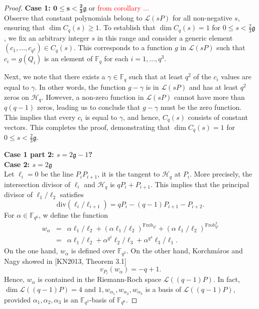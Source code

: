 \documentclass[11pt]{amsart}
\theoremstyle{plain}
\theoremstyle{definition}
\theoremstyle{remark}
\newcommand{\g}{\mathfrak{g}}
\begin{document}
\begin{proof}
	\textbf{Case 1: $\mathbf{0 \leq s <\frac{2}{3}\g}$} or \textcolor{red}{from corollary ...}\\
	Observe that constant polynomials belong to $\mathscr{L}(sP)$ for all non-negative $s$, ensuring that $\dim C_{q}(s)\geq 1$. To establish that $\dim C_{q}(s) = 1$ for $0 \leq s <\frac{2}{3}\g$, we fix an arbitrary integer $s$ in this range and consider a generic element $(c_1,\ldots,c_{q^3}) \in C_{q}(s)$. This corresponds to a function $g$ in $\mathscr{L}(sP)$ such that $c_i=g(Q_i)$ is an element of $\mathbb{F}_q$ for each $i=1,\ldots,q^3$. 
	
	Next, we note that there exists a $\gamma \in \mathbb{F}_q$ such that at least $q^2$ of the $c_i$ values are equal to $\gamma$. In other words, the function $g-\gamma$ is in $\mathscr{L}(sP)$ and has at least $q^2$ zeros on $\mathscr{H}_q$. However, a non-zero function in $\mathscr{L}(sP)$ cannot have more than $q(q-1)$ zeros, leading us to conclude that $g-\gamma$ must be the zero function. This implies that every $c_i$ is equal to $\gamma$, and hence, $C_{q}(s)$ consists of constant vectors. This completes the proof, demonstrating that $\dim C_{q}(s) = 1$ for $0 \leq s <\frac{2}{3}\g$.
	
	\textbf{Case 1 part 2: $s=2\mathfrak{g}-1$?}\\
	
	
	
	\textbf{Case 2: $s=2\mathfrak{g}$}\\
	
	
	
	Let $\ell_i=0$ be the line $P_iP_{i+1}$, it is the tangent to $\mathscr{H}_q$ at $P_i$. More precisely, the intersection divisor of $\ell_i$ and $\mathscr{H}_q$ is $qP_i+P_{i+1}$. This implies that the principal divisor of $\ell_1/\ell_2$ satisfies
	\[\mathrm{div}(\ell_i/\ell_{i+1})=qP_i-(q-1)P_{i+1}-P_{i+2}.\]
	For $\alpha \in \mathbb{F}_{q^6}$, w define the function
	\begin{eqnarray*}
		w_\alpha&=&\alpha\ell_1/\ell_2+(\alpha\ell_1/\ell_2)^{\mathrm{Frob}_{q^2}}+(\alpha\ell_1/\ell_2)^{\mathrm{Frob}_{q^2}^2}\\
		&=&\alpha\ell_1/\ell_2+\alpha^{q^2}\ell_2/\ell_3+\alpha^{q^4}\ell_3/\ell_1.
	\end{eqnarray*}
	On the one hand, $w_\alpha$ is defined over $\mathbb{F}_{q^2}$. On the other hand, Korchm\'aros and Nagy showed in [KN2013, Theorem 3.1]
	\[v_{P_i}(w_\alpha)=-q+1.\]
	Hence, $w_\alpha$ is contained in the Riemann-Roch space $\mathscr{L}((q-1)P)$. In fact, $\dim\mathscr{L}((q-1)P)=4$ and $1,w_{\alpha_1}, w_{\alpha_2}, w_{\alpha_3}$ is a basis of $\mathscr{L}((q-1)P)$, provided $\alpha_1,\alpha_2,\alpha_3$ is an $\mathbb{F}_{q^2}$-basis of $\mathbb{F}_{q^6}$. 
	

\end{proof}
\end{document}
